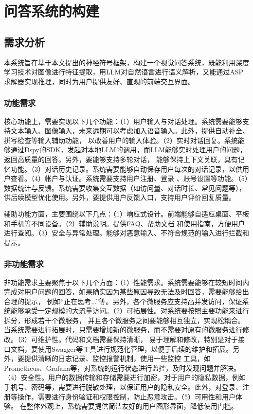 \chapter{问答系统的构建}
\section{需求分析}
本系统旨在基于本文提出的神经符号框架，构建一个视觉问答系统，既能利用深度学习技术对图像进行特征提取，用LLM对自然语言进行语义解析，又能通过ASP
求解器实现推理，同时为用户提供友好、直观的前端交互界面。

\subsection{功能需求}
核心功能上，需要实现以下几个功能：（1）用户输入与对话处理。系统需要能够支持文本输入、图像输入，未来远期可以考虑加入语音输入。此外，提供自动补全、拼写检查等输入辅助功能，
以改善用户的输入体验。（2）实时对话回复。系统能够通过Dspy的SDK，发起对本地LLM的调用，而LLM能够实时处理用户的问题，返回高质量的回答。另外，要能够支持多轮对话，
能够保持上下文关联，具有记忆功能。（3）对话历史记录。系统需要能够自动保存用户每次的对话记录，以供用户查看。（4）帐户与认证。系统需要支持用户注册、登录
、账号设置等功能。（5）数据统计与反馈。系统需要收集交互数据（如访问量、对话时长、常见问题等），供后续模型优化使用。另外，要提供用户反馈入口，支持用户评价回复质量。

辅助功能方面，主要围绕以下几点：（1）响应式设计。前端能够自适应桌面、平板和手机等不同设备。（2）辅助说明。提供FAQ、帮助文档
和使用指南，方便用户进行查阅。（3）安全与异常处理。能够对恶意输入、不符合规范的输入进行拦截和提示。
\subsection{非功能需求}
非功能需求主要聚焦于以下几个方面：（1）性能需求。系统需要能够在较短时间内完成对用户问题的回答，如果确实因为某些原因导致无法及时回答，需要能够给出合理的提示，
例如“正在思考...”等。另外，各个微服务应支持高并发访问，保证系统能够承受一定规模的大流量访问。（2）可拓展性。对系统要按照主要功能来进行拆分，形成若干个微服务，
并且各个微服务之间要能够相互独立，实现松耦合。当系统需要进行拓展时，只需要增加新的微服务，而不需要对原有的微服务进行修改。（3）可维护性。代码和文档需要保持清晰，
易于理解和修改，特别是对于接口文档，要使用Swagger等工具进行规范化管理，以便于后续的维护和拓展。另外，要提供清晰的日志记录、监控报警机制，使用一些监控
工具，如Prometheus、Grafana等，对系统的运行状态进行监控，及时发现问题并解决。（4）安全性。用户的数据传输和存储需要进行加密，对于用户的隐私数据，例如
手机号、密码等，需要进行脱敏处理，以保证用户的隐私安全。此外，对登录、注册等操作，需要进行身份验证和权限控制，防止恶意攻击。（5）可用性和用户体验。
在整体外观上，系统需要提供简洁友好的用户图形界面，降低使用门槛。

